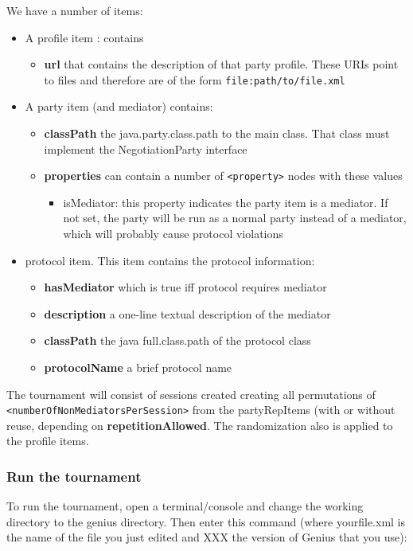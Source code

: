 \documentclass[]{llncs}
\newcommand\Genius{{\sc Genius}}
\begin{document}
We have a number of items:
\begin{itemize}

\item A profile item : contains 
	 \begin{itemize}
	\item \textbf{url} that contains the description of that party profile. These URIs point to files and therefore are of the form \verb|file:path/to/file.xml|
  	\end{itemize}

\item A party item  (and mediator) contains:
  \begin{itemize}
    \item \textbf{classPath} the java.party.class.path to the main class. That class must implement the NegotiationParty interface
    \item \textbf{properties} can contain a number of \verb|<property>| nodes with these values
    		\begin{itemize}
		\item isMediator: this property indicates the party item is a mediator. If not set, the party will be 
		run as a normal party instead of a mediator, which will probably cause protocol violations
		\end{itemize}
  \end{itemize}

\item protocol item. This item contains the protocol information: 
	\begin{itemize}
	\item \textbf{hasMediator} which is true iff protocol requires mediator
	\item \textbf{description} a one-line textual description of the mediator
	\item \textbf{classPath} the java full.class.path of the protocol class
	\item \textbf{protocolName} a brief protocol name 
	\end{itemize}
\end{itemize}



The tournament will consist of sessions created creating all permutations of \verb|<numberOfNonMediatorsPerSession>| from the partyRepItems (with or without reuse, depending on \textbf{repetitionAllowed}. The randomization also is applied to the profile items.


\subsubsection{Run the tournament}
To run the tournament, open a terminal/console and change the working directory to the genius directory.
Then enter this command (where yourfile.xml is the name of the file you just edited and XXX the version of {\Genius} that you use):
\end{document}
